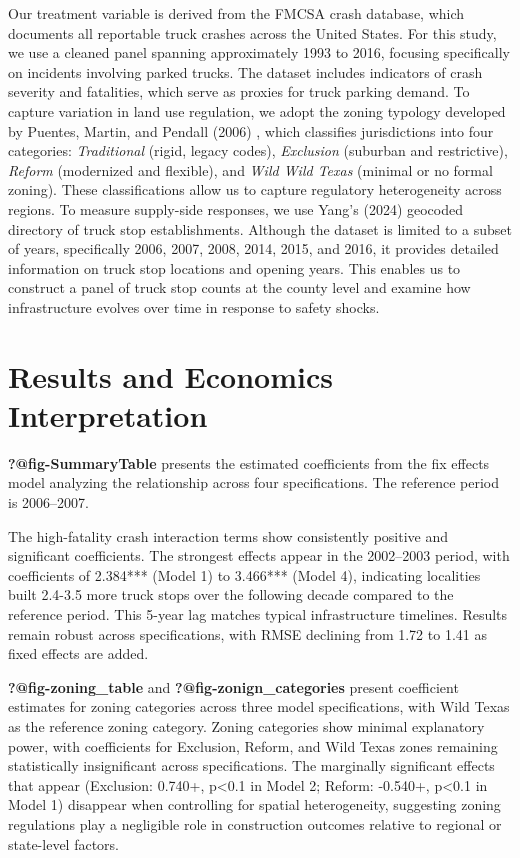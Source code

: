 \documentclass[
  12pt]{article}
\begin{document}
Our treatment variable is derived from the FMCSA crash database, which
documents all reportable truck crashes across the United States. For
this study, we use a cleaned panel spanning approximately 1993 to 2016,
focusing specifically on incidents involving parked trucks. The dataset
includes indicators of crash severity and fatalities, which serve as
proxies for truck parking demand. To capture variation in land use
regulation, we adopt the zoning typology developed by Puentes, Martin,
and Pendall (2006) \citep{puentesTraditionalReformedReview2006}, which
classifies jurisdictions into four categories: \emph{Traditional}
(rigid, legacy codes), \emph{Exclusion} (suburban and restrictive),
\emph{Reform} (modernized and flexible), and \emph{Wild Wild Texas}
(minimal or no formal zoning). These classifications allow us to capture
regulatory heterogeneity across regions. To measure supply-side
responses, we use Yang's (2024) geocoded directory of truck stop
establishments. Although the dataset is limited to a subset of years,
specifically 2006, 2007, 2008, 2014, 2015, and 2016, it provides
detailed information on truck stop locations and opening years. This
enables us to construct a panel of truck stop counts at the county level
and examine how infrastructure evolves over time in response to safety
shocks.

\section{Results and Economics
Interpretation}\label{results-and-economics-interpretation}

\textbf{?@fig-SummaryTable} presents the estimated coefficients from the
fix effects model analyzing the relationship across four specifications.
The reference period is 2006--2007.

The high-fatality crash interaction terms show consistently positive and
significant coefficients. The strongest effects appear in the 2002--2003
period, with coefficients of 2.384*** (Model 1) to 3.466*** (Model 4),
indicating localities built 2.4-3.5 more truck stops over the following
decade compared to the reference period. This 5-year lag matches typical
infrastructure timelines. Results remain robust across specifications,
with RMSE declining from 1.72 to 1.41 as fixed effects are added.

\textbf{?@fig-zoning\_table} and \textbf{?@fig-zonign\_categories}
present coefficient estimates for zoning categories across three model
specifications, with Wild Texas as the reference zoning category. Zoning
categories show minimal explanatory power, with coefficients for
Exclusion, Reform, and Wild Texas zones remaining statistically
insignificant across specifications. The marginally significant effects
that appear (Exclusion: 0.740+, p\textless0.1 in Model 2; Reform:
-0.540+, p\textless0.1 in Model 1) disappear when controlling for
spatial heterogeneity, suggesting zoning regulations play a negligible
role in construction outcomes relative to regional or state-level
factors.
\end{document}
